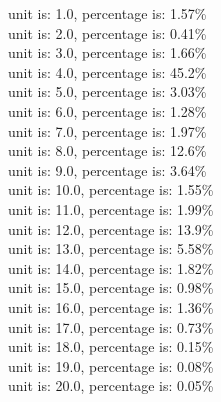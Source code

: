 unit is: 1.0, percentage is: 1.57\% \\
unit is: 2.0, percentage is: 0.41\% \\
unit is: 3.0, percentage is: 1.66\% \\
unit is: 4.0, percentage is: 45.2\% \\
unit is: 5.0, percentage is: 3.03\% \\
unit is: 6.0, percentage is: 1.28\% \\
unit is: 7.0, percentage is: 1.97\% \\
unit is: 8.0, percentage is: 12.6\% \\
unit is: 9.0, percentage is: 3.64\% \\
unit is: 10.0, percentage is: 1.55\% \\
unit is: 11.0, percentage is: 1.99\% \\
unit is: 12.0, percentage is: 13.9\% \\
unit is: 13.0, percentage is: 5.58\% \\
unit is: 14.0, percentage is: 1.82\% \\
unit is: 15.0, percentage is: 0.98\% \\
unit is: 16.0, percentage is: 1.36\% \\
unit is: 17.0, percentage is: 0.73\% \\
unit is: 18.0, percentage is: 0.15\% \\
unit is: 19.0, percentage is: 0.08\% \\
unit is: 20.0, percentage is: 0.05\% \\

